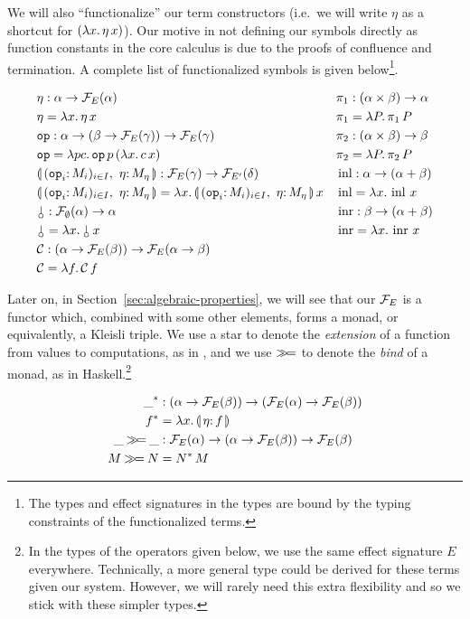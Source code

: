 We will also ``functionalize'' our term constructors (i.e.\ we will write
$\eta$ as a shortcut for $(\lambda x.\, \eta\,x)$). Our motive in not defining
our symbols directly as function constants in the core calculus is due to
the proofs of confluence and termination. A complete list of functionalized
symbols is given below\footnote{The types and effect signatures in the
  types are bound by the typing constraints of the functionalized terms.}.

\begin{align*}
  &\eta : \alpha \to \FF_E(\alpha) &
  &\pi_1 : (\alpha \times \beta) \to \alpha \\
  &\eta = \lam{x}{\etaE{x}} &
  &\pi_1 = \lam{P}{\ap{\pi_1}{P}} \\
  &\op{op} : \alpha \to (\beta \to \FF_E(\gamma)) \to \FF_E(\gamma) &
  &\pi_2 : (\alpha \times \beta) \to \beta \\
  &\op{op} = \lam{p c}{\app{\op{op}}{p}{(\lam{x}{\ap{c}{x}})}} &
  &\pi_2 = \lam{P}{\ap{\pi_2}{P}} \\
  &\cibanana : \FF_E(\gamma) \to \FF_{E'}(\delta) &
  &\inl : \alpha \to (\alpha + \beta) \\
  &\cibanana = \lam{x}{\ap{\cibanana}{x}} &
  &\inl = \lam{x}{\ap{\inl}{x}} \\
  &\cherry : \FF_\emptyset(\alpha) \to \alpha &
  &\inr : \beta \to (\alpha + \beta) \\
  &\cherry = \lam{x}{\ap{\cherry}{x}} &
  &\inr = \lam{x}{\ap{\inr}{x}} \\
  &\CC : (\alpha \to \FF_E(\beta)) \to \FF_E(\alpha \to \beta) \\
  &\CC = \lam{f}{\ap{\CC}{f}} \\
\end{align*}

Later on, in Section~\ref{sec:algebraic-properties}, we will see that our
$\mathcal{F}_E$ is a functor which, combined with some other elements, forms a
monad, or equivalently, a Kleisli triple. We use a star to denote the
\emph{extension} of a function from values to computations, as in
\cite{moggi1991notions}, and we use $\mathbin{\gg\!=}$ to denote the \emph{bind} of
a monad, as in Haskell.\footnote{In the types of the operators given below,
  we use the same effect signature $E$ everywhere. Technically, a more
  general type could be derived for these terms given our system. However,
  we will rarely need this extra flexibility and so we stick with these
  simpler types.}

\begin{align*}
  \_^* &: (\alpha \to \FF_E(\beta)) \to (\FF_E(\alpha) \to \FF_E(\beta)) \\
  f^* &= \lam{x}{\banana{\onto{\eta}{f}}} \\
  \_ \hsbind \_ &: \FF_E(\alpha) \to (\alpha \to \FF_E(\beta)) \to \FF_E(\beta) \\
  M \hsbind N &= \ap{N^*}{M} \\
\end{align*}

